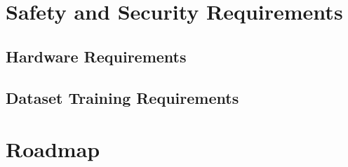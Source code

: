 \documentclass{article}
\begin{document}
\section{Safety and Security Requirements}

\subsection{Hardware Requirements}

\subsection{Dataset Training Requirements}


\section{Roadmap}

\end{document}
